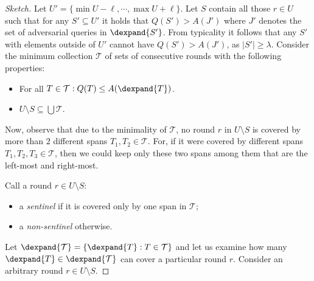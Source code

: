 \begin{proof}[Sketch]
  Let $U' = \{\min U - \ell, \cdots, \max U + \ell\}$.
  Let $S$ contain all those $r \in U$ such that for any $S' \subseteq U'$
  it holds that $Q(S') > A(J')$ where $J'$ denotes the set of adversarial
  queries in $\dexpand{S'}$. From typicality it follows that
  any $S'$ with elements outside of $U'$ cannot have $Q(S') > A(J')$,
  as $|S'| \geq \lambda$.
  Consider the minimum collection $\mathcal{T}$ of sets of consecutive rounds
  with the following properties:

  \begin{itemize}
    \item For all $T \in \mathcal{T}: Q(T) \leq A(\dexpand{T})$.
    \item $U \setminus S \subseteq \bigcup \mathcal{T}$.
  \end{itemize}

  Now, observe that due to the minimality of $\mathcal{T}$, no round $r$ in
  $U \setminus S$ is covered by more than $2$ different spans
  $T_1, T_2 \in \mathcal{T}$. For, if it were covered by different spans
  $T_1, T_2, T_3 \in \mathcal{T}$, then we could keep only these two spans among
  them that are the left-most and right-most.

  Call a round $r \in U \setminus S$:
  \begin{itemize}
    \item a \emph{sentinel} if it is covered only by one span in $\mathcal{T}$;
    \item a \emph{non-sentinel} otherwise.
  \end{itemize}

  Let $\dexpand{\mathcal{T}} = \{\dexpand{T}: T \in \mathcal{T}\}$ and let us examine
  how many $\dexpand{T} \in \dexpand{\mathcal{T}}$ can cover a particular round $r$.
  Consider an arbitrary round $r \in U \setminus S$.


\end{proof}
